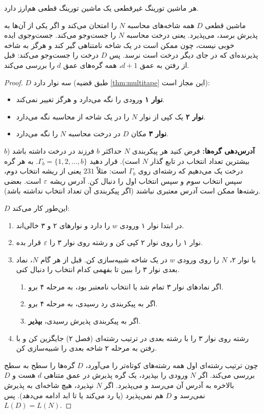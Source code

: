 \begin{theorem}\label{thm:ntm}
هر ماشین تورینگ غیرقطعی یک ماشین تورینگ قطعی هم‌ارز دارد.
\end{theorem}

\begin{proofidea}
ماشین قطعی $D$ همه شاخه‌های محاسبه  $N$ را امتحان می‌کند و اگر یکی از آن‌ها به پذیرش برسد، می‌پذیرد. یعنی درخت محاسبه $N$ را جست‌وجو می‌کند. جست‌وجوی  ایده خوبی نیست، چون ممکن است در یک شاخه نامتناهی گیر کند و هرگز به شاخه پذیرنده‌ای که در جای دیگر درخت است نرسد. پس $D$ درخت را  جست‌وجو می‌کند: قبل از رفتن به عمق $d+1$، همه گره‌های عمق $d$ را بررسی می‌کند.
\end{proofidea}

\begin{proof}
$D$ سه نوار دارد (طبق قضیه \ref{thm:multitape} این مجاز است):
\begin{itemize}
\item \textbf{نوار ۱} ورودی را نگه می‌دارد و هرگز تغییر نمی‌کند.
\item \textbf{نوار ۲} یک کپی از نوار $N$ را در یک شاخه از محاسبه نگه می‌دارد.
\item \textbf{نوار ۳} مکان $D$ در درخت محاسبه $N$ را نگه می‌دارد.
\end{itemize}
\textbf{آدرس‌دهی گره‌ها:} فرض کنید هر پیکربندی $N$ حداکثر $b$ فرزند در درخت داشته باشد ($b$ بیشترین تعداد انتخاب در تابع گذار $N$ است). قرار دهید $\Gamma_b=\{1,2,\dots,b\}$. به هر گره درخت یک  می‌دهیم که رشته‌ای روی $\Gamma_b$ است: مثلاً $231$ یعنی از ریشه انتخاب دوم، سپس انتخاب سوم و سپس انتخاب اول را دنبال کن. آدرس ریشه $\varepsilon$ است. بعضی رشته‌ها ممکن است آدرس معتبری نباشند (اگر پیکربندی آن تعداد انتخاب نداشته باشد).

$D$ این‌طور کار می‌کند:
\begin{enumerate}
\item در ابتدا نوار ۱ ورودی $w$ را دارد و نوارهای ۲ و ۳ خالی‌اند.
\item نوار ۱ را روی نوار ۲ کپی کن و رشته روی نوار ۳ را $\varepsilon$ قرار بده.
\item با نوار ۲، $N$ را روی ورودی $w$ در یک شاخه شبیه‌سازی کن. قبل از هر گام $N$، نماد بعدی نوار ۳ را ببین تا بفهمی کدام انتخاب را دنبال کنی.
\begin{enumerate}
\item اگر نمادهای نوار ۳ تمام شد یا انتخاب نامعتبر بود، به مرحله ۴ برو.
\item اگر به پیکربندی رد رسیدی، به مرحله ۴ برو.
\item اگر به پیکربندی پذیرش رسیدی، \textbf{بپذیر}.
\end{enumerate}
\item رشته روی نوار ۳ را با رشته بعدی در ترتیب رشته‌ای (فصل ۲) جایگزین کن و با رفتن به مرحله ۲ شاخه بعدی را شبیه‌سازی کن.
\end{enumerate}
چون ترتیب رشته‌ای اول همه رشته‌های کوتاه‌تر را می‌آورد، $D$ گره‌ها را سطح به سطح بررسی می‌کند. اگر $N$ ورودی را بپذیرد، یک گره پذیرش در عمق متناهی $d$ هست و $D$ بالاخره به آدرس آن می‌رسد و می‌پذیرد. اگر $N$ نپذیرد، هیچ شاخه‌ای به پذیرش نمی‌رسد و $D$ هم نمی‌پذیرد (یا رد می‌کند یا تا ابد ادامه می‌دهد). پس $L(D)=L(N)$.
\end{proof}

